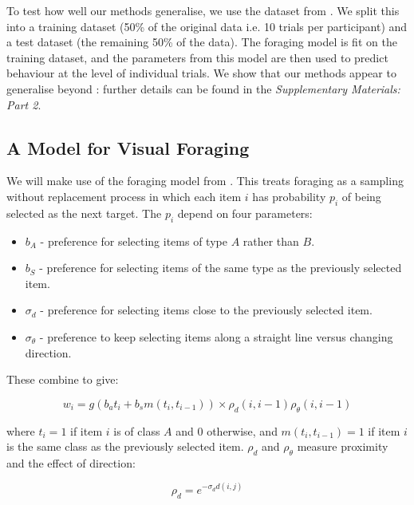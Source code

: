 \documentclass[preprints, article,submit,pdftex,moreauthors]{Definitions/mdpi}
\begin{document}
To test how well our methods generalise, we use the dataset from \citep{kristjansson2014}. We split this into a training dataset (50\% of the original data i.e. 10 trials per participant) and a test dataset (the remaining 50\% of the data). The foraging model is fit on the training dataset, and the parameters from this model are then used to predict behaviour at the level of individual trials. We show that our methods appear to generalise beyond \citep{clarke2022}: further details can be found in the \textit{Supplementary Materials: Part 2}.


\subsection{A Model for Visual Foraging}

We will make use of the foraging model from \cite{clarke2022}. This treats foraging as a sampling without replacement process in which each item $i$ has probability $p_i$ of being selected as the next target. The $p_i$ depend on four parameters:

\begin{itemize}
    \item $b_A$ - preference for selecting items of type $A$ rather than $B$.
    \item $b_S$ - preference for selecting items of the same type as the previously selected item.
    \item $\sigma_d$ - preference for selecting items close to the previously selected item.
    \item $\sigma_{\theta}$ - preference to keep selecting items along a straight line versus changing direction.
\end{itemize}

These combine to give:

\begin{linenomath}
\begin{equation}
    w_i = g\left(b_at_i + b_sm(t_i, t_{i-1})\right) \times \rho_d(i, i-1) \rho_{\theta}(i, i-1)
\end{equation}
\end{linenomath}

where $t_i = 1$ if item $i$ is of class $A$ and 0 otherwise, and  $m(t_i, t_{i-1}) =1$ if item $i$ is the same class as the previously selected item. $\rho_d$ and $\rho_{\theta}$ measure proximity and the effect of direction:

\begin{linenomath}
\begin{equation}
    \rho_d = e^{-\sigma_dd(i,j)}
\end{equation}
\end{linenomath}
\end{document}
